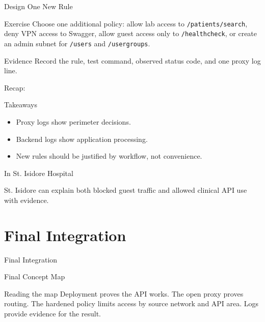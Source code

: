 \documentclass[presentation]{beamer}
\newcommand{\sectiontitleframe}[1]{
\begin{frame}[plain,c]
\begin{center}
{\usebeamerfont{title}\usebeamercolor[fg]{title}#1}
\end{center}
\end{frame}
}
\newcommand{\scenario}{St. Isidore Hospital}
\newcommand{\takeawaysframe}[2]{
\begin{frame}[c]{Recap: \insertsection}
\begin{block}{Takeaways}
#1
\end{block}
\begin{exampleblock}{In \scenario}
#2
\end{exampleblock}
\end{frame}
}
\begin{document}
\begin{frame}[c]{Design One New Rule}
\begin{block}{Exercise}
Choose one additional policy: allow lab access to \texttt{/patients/search}, deny VPN access to
Swagger, allow guest access only to \texttt{/healthcheck}, or create an admin subnet for
\texttt{/users} and \texttt{/usergroups}.
\end{block}

\begin{exampleblock}{Evidence}
Record the rule, test command, observed status code, and one proxy log line.
\end{exampleblock}
\end{frame}

\takeawaysframe{
\begin{itemize}
    \item Proxy logs show perimeter decisions.
    \item Backend logs show application processing.
    \item New rules should be justified by workflow, not convenience.
\end{itemize}
}{
St. Isidore can explain both blocked guest traffic and allowed clinical API use with evidence.
}

\section{Final Integration}
\sectiontitleframe{Final Integration}

\begin{frame}[c]{Final Concept Map}
\begin{center}
\end{center}

\begin{block}{Reading the map}
Deployment proves the API works. The open proxy proves routing. The hardened policy limits access by
source network and API area. Logs provide evidence for the result.
\end{block}
\end{frame}
\end{document}
